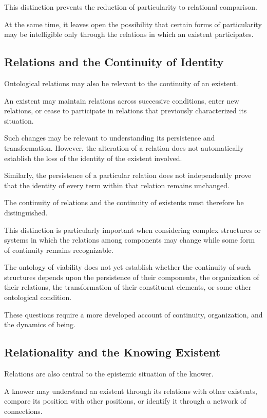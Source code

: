 This distinction prevents the reduction of particularity to relational comparison.

At the same time, it leaves open the possibility that certain forms of particularity may be intelligible only through the relations in which an existent participates.

\subsection{Relations and the Continuity of Identity}

Ontological relations may also be relevant to the continuity of an existent.

An existent may maintain relations across successive conditions, enter new relations, or cease to participate in relations that previously characterized its situation.

Such changes may be relevant to understanding its persistence and transformation. However, the alteration of a relation does not automatically establish the loss of the identity of the existent involved.

Similarly, the persistence of a particular relation does not independently prove that the identity of every term within that relation remains unchanged.

The continuity of relations and the continuity of existents must therefore be distinguished.

This distinction is particularly important when considering complex structures or systems in which the relations among components may change while some form of continuity remains recognizable.

The ontology of viability does not yet establish whether the continuity of such structures depends upon the persistence of their components, the organization of their relations, the transformation of their constituent elements, or some other ontological condition.

These questions require a more developed account of continuity, organization, and the dynamics of being.

\subsection{Relationality and the Knowing Existent}

Relations are also central to the epistemic situation of the knower.

A knower may understand an existent through its relations with other existents, compare its position with other positions, or identify it through a network of connections.

